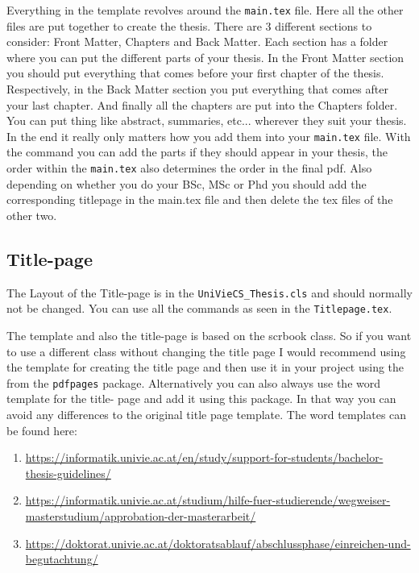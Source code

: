 Everything in the template revolves around the \verb|main.tex| file. Here all the other files are put together to create the thesis.
There are 3 different sections to consider: Front Matter, Chapters and Back Matter. Each section has a folder where you can put the different parts of your thesis. In the Front Matter section you should put everything that comes before your first chapter of the thesis. Respectively, in the Back Matter section you put everything that comes after your last chapter. And finally all the chapters are put into the Chapters folder. You can put thing like abstract, summaries, etc... wherever they suit your thesis. In the end it really only matters how you add them into your \verb|main.tex| file. With the \verb|| command you can add the parts if they should appear in your thesis, the order within the \verb|main.tex| also determines the order in the final pdf. Also depending on whether you do your BSc, MSc or Phd you should add the corresponding titlepage in the main.tex file and then delete the tex files of the other two.

\subsection{Title-page}
The Layout of the Title-page is in the \verb|UniVieCS_Thesis.cls| and should normally not be changed. You can use all the commands as seen in the \verb|Titlepage.tex|. 

The template and also the title-page is based on the scrbook class. So if you want to use a different class without changing the title page I would recommend using the template for creating the title page and then use it in your project using the 
\verb|| from the \verb|pdfpages| package. Alternatively you can also always use the word template for the title- page and add it using this package. In that way you can avoid any differences to the original title page template. The word templates can be found here:
\begin{enumerate}
    \item \url{https://informatik.univie.ac.at/en/study/support-for-students/bachelor-thesis-guidelines/}
    \item \url{https://informatik.univie.ac.at/studium/hilfe-fuer-studierende/wegweiser-masterstudium/approbation-der-masterarbeit/ }
    \item \url{https://doktorat.univie.ac.at/doktoratsablauf/abschlussphase/einreichen-und-begutachtung/}

\end{enumerate}

